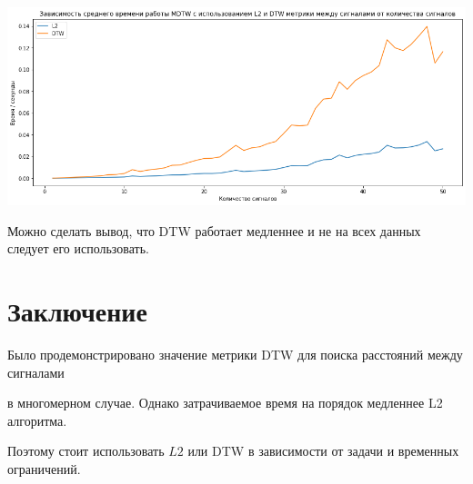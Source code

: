 \documentclass[12pt, twoside]{article}
\begin{document}
\includegraphics[scale=0.5]{time}

Можно сделать вывод, что DTW работает медленнее и не на всех данных следует его использовать.

\section{Заключение}

Было продемонстрировано значение метрики DTW для поиска расстояний между сигналами

в многомерном случае. Однако затрачиваемое время на порядок медленнее L2 алгоритма.

Поэтому стоит использовать $L2$ или DTW в зависимости от задачи и временных ограничений.


\nocite{*}
 


\end{document}
